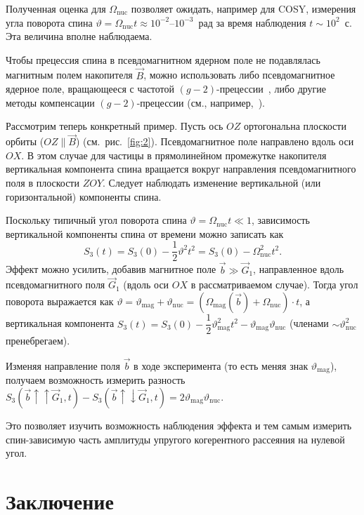 \documentclass[11pt,a4paper]{article}
\begin{document}
Полученная оценка для $\Omega_{\mathrm{nuc}}$ позволяет ожидать,
например для COSY, измерения угла поворота спина
$\vartheta=\Omega_{\mathrm{nuc}} t\approx 10^{-2}$--$10^{-3}$~рад
за время наблюдения $t\sim 10^{2}$~с. Эта величина вполне наблюдаема.

Чтобы прецессия спина в псевдомагнитном ядерном поле не подавлялась
магнитным полем накопителя $\vec{B}$, можно использовать либо
псевдомагнитное ядерное поле, вращающееся с частотой $(g-2)$-прецессии~\cite{BaryGurin05},
либо другие методы компенсации $(g-2)$-прецессии
(см., например,~\cite{Onderwater05,Farley04,Orlov05}).

Рассмотрим теперь конкретный пример. Пусть ось $OZ$ ортогональна
плоскости орбиты ($OZ\parallel\vec{B}$) (см.\ рис.~\ref{fig:2}).
Псевдомагнитное поле направлено вдоль оси $OX$. В этом случае для частицы
в прямолинейном промежутке накопителя вертикальная компонента спина
вращается вокруг направления псевдомагнитного поля в плоскости $ZOY$.
Следует наблюдать изменение вертикальной (или горизонтальной) компоненты спина.

Поскольку типичный угол поворота спина $\vartheta=\Omega_{\mathrm{nuc}} t\ll 1$,
зависимость вертикальной компоненты спина от времени можно записать как
\begin{equation}
S_3(t)=S_3(0)-\frac12\vartheta^2 t^2
=S_3(0)-\Omega_{\mathrm{nuc}}^2 t^2.
\label{eq:107}
\end{equation}
Эффект можно усилить, добавив магнитное поле $\vec{b}\gg\vec{G}_1$,
направленное вдоль псевдомагнитного поля $\vec{G}_1$ (вдоль оси $OX$
в рассматриваемом случае). Тогда угол поворота выражается как
$\vartheta=\vartheta_{\mathrm{mag}}+\vartheta_{\mathrm{nuc}}
=(\Omega_{\mathrm{mag}}(\vec{b})+\Omega_{\mathrm{nuc}})\cdot t$,
а вертикальная компонента
$S_3(t)=S_3(0)-\dfrac12\vartheta_{\mathrm{mag}}^2 t^2
-\vartheta_{\mathrm{mag}}\vartheta_{\mathrm{nuc}}$
(членами $\sim\vartheta_{\mathrm{nuc}}^2$ пренебрегаем).

Изменяя направление поля $\vec{b}$ в ходе эксперимента (то есть меняя
знак $\vartheta_{\mathrm{mag}}$), получаем возможность измерить разность
$S_3(\vec{b}\uparrow\uparrow\vec{G}_1,t)-S_3(\vec{b}\uparrow\downarrow\vec{G}_1,t)
=2\vartheta_{\mathrm{mag}}\vartheta_{\mathrm{nuc}}$.

Это позволяет изучить возможность наблюдения эффекта и тем самым
измерить спин-зависимую часть амплитуды упругого когерентного рассеяния
на нулевой угол.

\section{Заключение}
\end{document}
